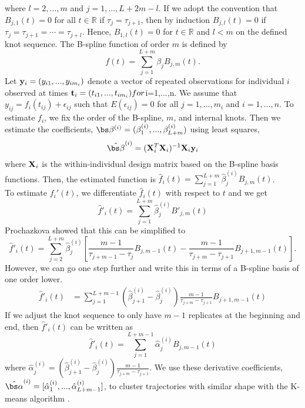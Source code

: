 where $l=2,...,m$ and $j=1,...,L+2m-l$.  If we adopt the convention that $B_{j,1}(t)=0$ for all $t\in\mathbb{R}$ if $\tau_{j}=\tau_{j+1}$, then by induction $B_{j,l}(t)=0$ if $\tau_{j}=\tau_{j+1}=\cdots=\tau_{j+l}$. Hence, $B_{1,l}(t)=0$ for $t\in\mathbb{R}$ and $l<m$ on the defined knot sequence. The B-spline function of order $m$ is defined by
$$f(t) = \sum^{L+m}_{j=1} \beta_j B_{j,m}(t).$$
Let $\mathbf y_{i}=(y_{i1},...,y_{im_{i}})$ denote a vector of repeated observations for individual $i$ observed at times $\mathbf t_{i}=(t_{i1},...,t_{im_{i}})  for $i=1,...,n$.$ We assume that $y_{ij} = f_{i}(t_{ij}) + \epsilon_{ij}$ such that $E(\epsilon_{ij}) = 0$ for all $j=1,...,m_{i}$ and $i=1,...,n$.  To estimate $f_{i}$, we fix the order of the B-spline, $m$, and internal knots. Then we estimate the coefficients, $\bs \beta^{(i)} = (\beta^{(i)}_1,...,\beta^{(i)}_{L+m})$ using least squares, 
$$\hat{\bs \beta}^{(i)} = (\B X_{i}^{T}\B X_{i})^{-1}\B X_{i}\B y_{i}$$
where $\mathbf X_{i}$ is the within-individual design matrix based on the B-spline basis functions. Then, the estimated function is $\hat{f}_i(t)=\sum^{L+m}_{j=1} \hat{\beta}^{(i)}_j B_{j,m}(t)$. \\

To estimate $f_i'(t)$, we differentiate $\hat{f}_i(t)$ with respect to $t$ and we get
$$\hat{f}'_i(t)=\sum^{L+m}_{j=1} \hat{\beta}^{(i)}_j B'_{j,m}(t)$$
Prochazkova \cite{prochazkova2005} showed that this can be simplified to
$$\hat{f}'_i(t)=\sum^{L+m}_{j=2} \hat{\beta}^{(i)}_j \left[\frac{m-1}{\tau_{j+m-1}-\tau_j} B_{j,m-1}(t)-\frac{m-1}{\tau_{j+m}-\tau_{j+1}} B_{j+1,m-1}(t)\right].$$
However, we can go one step further and write this in terms of a B-spline basis of one order lower.
\begin{align*}
\hat{f}'_i(t)&=\sum^{L+m-1}_{j=1} (\hat{\beta}^{(i)}_{j+1} -\hat{\beta}^{(i)}_j)\frac{m-1}{\tau_{j+m}-\tau_{j+1} }B_{j+1,m-1}(t)
\end{align*}
If we adjust the knot sequence to only have $m-1$ replicates at the beginning and end, then $\hat{f}'_{i}(t)$ can be written as
$$\hat{f}'_i(t)=\sum^{L+m-1}_{j=1}\hat{\alpha}^{(i)}_jB_{j,m-1}(t)$$
where $\hat{\alpha}^{(i)}_j= (\hat{\beta}^{(i)}_{j+1} -\hat{\beta}^{(i)}_j)\frac{m-1}{\tau_{j+m}-\tau_{j+1} }$.
We use these derivative coefficients, $\hat{\bs \alpha}^{(i)} = [\hat{\alpha}^{(i)}_1,...,\hat{\alpha}^{(i)}_{ L+m-1}]$, to cluster trajectories with similar shape with the K-means algorithm \cite{macqueen1967, hartigan1979}. 
